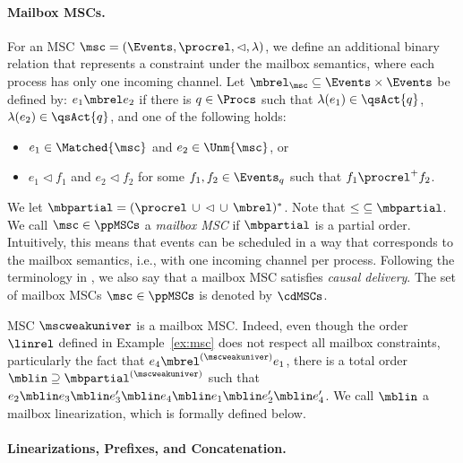 \paragraph*{Mailbox MSCs.}

For an MSC $\msc = (\Events,\procrel,\lhd,\lambda)$, we define
an additional binary relation that represents a constraint
under the mailbox semantics, where each process has only one incoming channel.
Let ${\mbrel}_\msc \subseteq \Events \times \Events$
be defined by: $e_1 \mbrel e_2$ if there is $q \in \Procs$
such that $\lambda(e_1) \in \qsAct{q}$,
$\lambda(e_2) \in \qsAct{q}$, and one of the following holds:
\begin{itemize}\itemsep=0.5ex
\item $e_1 \in \Matched{\msc}$ and $e_2 \in \Unm{\msc}$, or
\item $e_1 \lhd f_1$ and $e_2 \lhd f_2$ for some $f_1,f_2 \in \Events_q$ such that $f_1 \procrel^+ f_2$.
\end{itemize}

We let ${\mbpartial} = ({\procrel} \,\cup\, {\lhd} \,\cup\, {\mbrel})^\ast$.
Note that ${\le} \subseteq {\mbpartial}$.
%
We call $\msc \in \ppMSCs$ a \emph{mailbox MSC}
if ${\mbpartial}$ is a partial order.
Intuitively, this means that events can be scheduled in a way that corresponds
to the mailbox semantics, i.e., with one incoming channel per process.
Following the terminology in \cite{DBLP:conf/cav/BouajjaniEJQ18}, we also say that
a mailbox MSC satisfies \emph{causal delivery}.
The set of mailbox MSCs $\msc \in \ppMSCs$ is denoted by $\cdMSCs$.

\begin{example}\label{ex:mailbox-msc}
    MSC $\mscweakuniver$ is a mailbox MSC. Indeed, even though the order $\linrel$ defined in Example~\ref{ex:msc} does not respect all mailbox constraints, particularly the fact that $e_4 \mbrel^{(\mscweakuniver)} e_1$, there is a total order $ {\mblin} \supseteq {\mbpartial^{(\mscweakuniver)}}$ such that $
    e_2 \mblin e_3 \mblin e_3' \mblin e_4 \mblin e_1 \mblin e_2' \mblin e_4'$. We call $\mblin$ a mailbox linearization, which is formally defined below.
\end{example}

\paragraph*{Linearizations, Prefixes, and Concatenation.}

